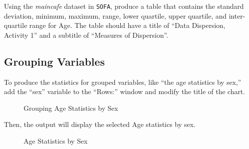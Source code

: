 Using the \textit{maincafe} dataset in \texttt{SOFA}, produce a table that contains the standard deviation, minimum, maximum, range, lower quartile, upper quartile, and inter-quartile range for Age. The table should have a title of ``Data Dispersion, Activity 1'' and a subtitle of ``Measures of Dispersion''.

\subsection{Grouping Variables}

To produce the statistics for grouped variables, like ``the age statistics by sex,'' add the ``sex'' variable to the ``Rows:'' window and modify the title of the chart.

\begin{figure}[H]
  \begin{center}
    \caption{Grouping Age Statistics by Sex}
  \end{center}
\end{figure}
 
Then, the output will display the selected Age statistics by sex.

\begin{figure}[H]
  \begin{center}
    \caption{Age Statistics by Sex}
  \end{center}
\end{figure}

